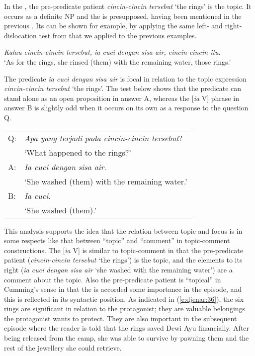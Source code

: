 \documentclass[output=paper
,modfonts
,nonflat]{langsci/langscibook}
\begin{document}
\noindent
In the  , the pre-predicate patient \textit{cincin-cincin tersebut} ‘the rings’ is the topic. It occurs as a definite NP and the  is presupposed, having been mentioned in the previous . Its  can be shown for example, by applying the same left- and right-dislocation test from \citet{Gundel2004} that we applied to the previous examples.

\begin{exe}
	\ex\label{e:djenar:38}
	\textit{Kalau cincin-cincin tersebut, ia cuci dengan sisa air, cincin-cincin itu}.\\
	\glt ‘As for the rings, she rinsed (them) with the remaining water, those rings.’
\end{exe}

\noindent
The  predicate \textit{ia cuci dengan sisa air} is focal in relation to the topic expression \textit{cincin-cincin tersebut} ‘the rings’. The test below shows that the predicate can stand alone as an open proposition in answer A, whereas the [\textit{ia} V] phrase in answer B is slightly odd when it occurs on its own as a response to the question Q. 

\begin{exe}
	\ex\label{e:djenar:39}
	\begin{tabular}[t]{ll}
		Q: & \textit{Apa yang terjadi pada cincin-cincin tersebut}?\\
		& ‘What happened to the rings?’\\
		A: & \textit{Ia cuci dengan sisa air}.\\
		& ‘She washed (them) with the remaining water.’\\
		B: & \textit{Ia cuci}.\\
		& ‘She washed (them).’
	\end{tabular}
\end{exe}

\noindent
This analysis supports the idea that the relation between topic and focus is in some respects like that between “topic” and “comment” \citep[175]{Gundel2004} in topic-comment constructions. The [\textit{ia} V]   is similar to topic-comment in that the pre-predicate patient (\textit{cincin-cincin tersebut} ‘the rings’) is the topic, and the elements to its right (\textit{ia cuci dengan sisa air} ‘she washed with the remaining water’) are a comment about the topic. Also the pre-predicate patient is “topical” in Cumming’s sense in that the  is accorded some importance in the episode, and this is reflected in its syntactic position. As indicated in (\ref{e:djenar:36}), the six rings are significant in relation to the protagonist; they are valuable belongings the protagonist wants to protect. They are also important in the subsequent episode where the reader is told that the rings saved Dewi Ayu financially. After being released from the camp, she was able to survive by pawning them and the rest of the jewellery she could retrieve.
\end{document}
